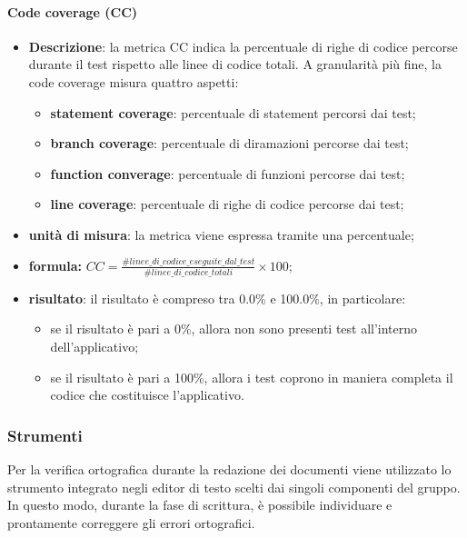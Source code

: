 			\paragraph{Code coverage (CC)}
				\begin{itemize}
					\item{\textbf{Descrizione}}: la metrica CC indica la percentuale di righe di codice percorse durante il test rispetto alle linee di codice totali. A granularità più fine, la code coverage misura quattro aspetti: 
						\begin{itemize}
							\item{\textbf{statement coverage}}: percentuale di statement percorsi dai test; 
							\item{\textbf{branch coverage}}: percentuale di diramazioni percorse dai test; 
							\item{\textbf{function converage}}: percentuale di funzioni percorse dai test; 
							\item{\textbf{line coverage}}: percentuale di righe di codice percorse dai test; 
						\end{itemize} 
					\item{\textbf{unità di misura}}: la metrica viene espressa tramite una percentuale;
					\item{\textbf{formula: }} $ CC = \displaystyle\frac{\#linee\_di\_codice\_eseguite\_dal\_test}{\#linee\_di\_codice\_totali}\times100$;
					\item{\textbf{risultato}}: il risultato è compreso tra 0.0\% e 100.0\%, in particolare: 
						\begin{itemize}
							\item se il risultato è pari a 0\%, allora non sono presenti test all'interno dell'applicativo; 
							\item se il risultato è pari a 100\%, allora i test coprono in maniera completa il codice che costituisce l'applicativo. 
						\end{itemize} 
				\end{itemize}

    \subsubsection{Strumenti}
	    Per la verifica ortografica durante la redazione dei documenti viene utilizzato lo strumento integrato negli editor di testo scelti dai singoli componenti del gruppo. In questo modo, durante la fase di scrittura, è possibile individuare e prontamente correggere gli errori ortografici. 
	    
